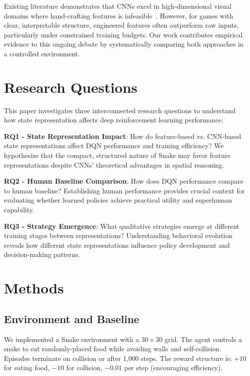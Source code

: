\documentclass[10pt,a4paper,twocolumn]{article}
\begin{document}
Existing literature demonstrates that CNNs excel in high-dimensional visual domains where hand-crafting features is infeasible~\cite{mnih2015human}. However, for games with clear, interpretable structure, engineered features often outperform raw inputs, particularly under constrained training budgets. Our work contributes empirical evidence to this ongoing debate by systematically comparing both approaches in a controlled environment.

\section{Research Questions}

This paper investigates three interconnected research questions to understand how state representation affects deep reinforcement learning performance:

\textbf{RQ1 - State Representation Impact}: How do feature-based vs. CNN-based state representations affect DQN performance and training efficiency? We hypothesize that the compact, structured nature of Snake may favor feature representations despite CNNs' theoretical advantages in spatial reasoning.

\textbf{RQ2 - Human Baseline Comparison}: How does DQN performance compare to human baseline? Establishing human performance provides crucial context for evaluating whether learned policies achieve practical utility and superhuman capability.

\textbf{RQ3 - Strategy Emergence}: What qualitative strategies emerge at different training stages between representations? Understanding behavioral evolution reveals how different state representations influence policy development and decision-making patterns.

\section{Methods}

\subsection{Environment and Baseline}

We implemented a Snake environment with a $30 \times 30$ grid. The agent controls a snake to eat randomly-placed food while avoiding walls and self-collision. Episodes terminate on collision or after 1,000 steps. The reward structure is: $+10$ for eating food, $-10$ for collision, $-0.01$ per step (encouraging efficiency).
\end{document}
